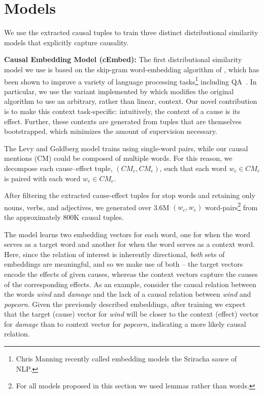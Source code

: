 \section{Models}
\label{sec-emnlp2016:models}

We use the extracted causal tuples to train three distinct distributional similarity models that explicitly capture causality. 

{\flushleft \textbf{Causal Embedding Model (cEmbed):}}
The first distributional similarity model we use is based on the skip-gram word-embedding algorithm of \citet{mikolov2013distributed}, which has been shown to improve a variety of language processing tasks\footnote{Chris Manning recently called embedding models the Sriracha sauce of NLP.} 
including QA~\citep{yih13,fried2015higher}.  In particular, we use the variant implemented by \citet{levy2014dependency} which modifies the original algorithm to use an arbitrary, rather than linear, context. 
Our novel contribution is to make this context task-specific: intuitively, the context of a cause is its effect.  Further, these contexts are generated from tuples that are themselves bootstrapped, which minimizes the amount of supervision necessary.

The Levy and Goldberg model trains using single-word pairs, while our causal mentions (CM) could be composed of multiple words.  
For this reason, we decompose each cause--effect tuple, $(CM_c,CM_e)$, such that each word $w_c \in CM_c$ is paired with each word $w_e \in CM_e$. 

After filtering the extracted cause-effect tuples for stop words and retaining only nouns, verbs, and adjectives, we generated over 3.6M $(w_c, w_e)$ word-pairs\footnote{For all models proposed in this section we used lemmas rather than words.} from the approximately 800K causal tuples.

The model learns two embedding vectors for each word, one for when the word serves as a target word and another for when the word serves as a context word.  Here, since the relation of interest is inherently directional, \textit{both} sets of embeddings are meaningful, and so we make use of both -- the target vectors encode the effects of given causes, whereas the context vectors capture the causes of the corresponding effects.  
As an example, consider the causal relation between the words \textit{wind} and \textit{damage} and the lack of a causal relation between \textit{wind} and \textit{popcorn}.  Given the previously described embeddings, after training we expect that the target (cause) vector for \textit{wind} will be closer to the context (effect) vector for \textit{damage} than to context vector for \textit{popcorn}, indicating a more likely causal relation.

